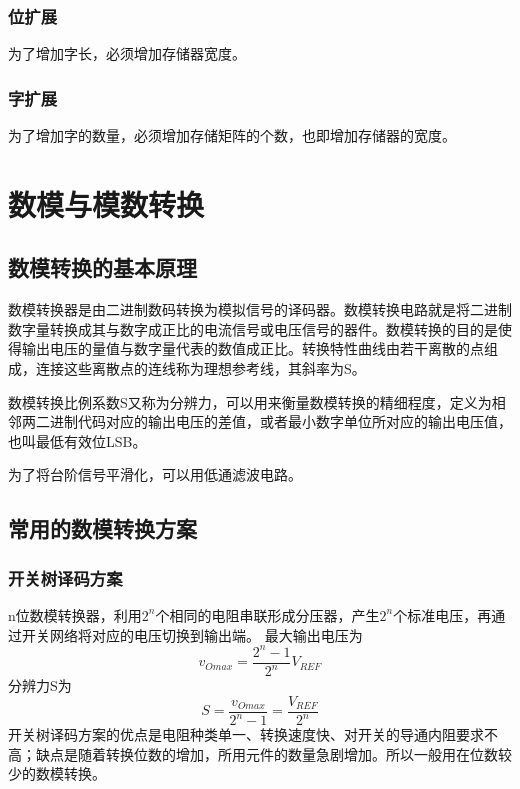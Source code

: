 \documentclass{ctexart}
\begin{document}
\subsubsection{位扩展}
为了增加字长，必须增加存储器{\color{red}{数据线}}宽度。
\subsubsection{字扩展}
为了增加字的数量，必须增加存储矩阵{\color{red}{地址}}的个数，也即增加存储器{\color{red}{地址线}}的宽度。
\section{数模与模数转换}
\subsection{数模转换的基本原理}
数模转换器是由二进制数码转换为模拟信号的译码器。数模转换电路就是将二进制数字量转换成其与数字成正比的电流信号或电压信号的器件。数模转换的目的是使得输出电压的量值与数字量代表的数值成正比。转换特性曲线由若干离散的点组成，连接这些离散点的连线称为理想参考线，其斜率为S。

数模转换比例系数S又称为分辨力，可以用来衡量数模转换的精细程度，定义为相邻两二进制代码对应的输出电压的差值，或者最小数字单位所对应的输出电压值，也叫最低有效位LSB。

为了将台阶信号平滑化，可以用低通滤波电路。
\subsection{常用的数模转换方案}
\subsubsection{开关树译码方案}
n位数模转换器，利用$2^n$个相同的电阻串联形成分压器，产生$2^n$个标准电压，再通过开关网络将对应的电压切换到输出端。
最大输出电压为
\begin{equation}
    v_{Omax}=\dfrac{2^n-1}{2^n}V_{REF}
\end{equation}
分辨力S为
\begin{equation}
    S=\dfrac{v_{Omax}}{2^n -1}=\dfrac{V_{REF}}{2^n}
\end{equation}
开关树译码方案的优点是电阻种类单一、转换速度快、对开关的导通内阻要求不高；缺点是随着转换位数的增加，所用元件的数量急剧增加。所以一般用在位数较少的数模转换。
\end{document}
